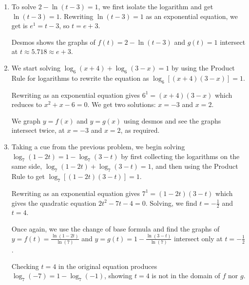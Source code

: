 \documentclass{ximera}
\begin{document}
\begin{example}
\begin{explanation}
\begin{enumerate}
\item  To solve  $2 - \ln(t-3) = 1$, we first isolate the logarithm and get $\ln(t-3) = 1$. Rewriting $\ln(t-3) = 1$ as an exponential equation, we get is $e^{1} = t-3$, so $t =e+3$. 

Desmos shows the graphs of $f(t) = 2 - \ln(t-3)$ and $g(t) = 1$ intersect at $t \approx   5.718 \approx e+3$.

\begin{center}
\end{center}


\item We  start solving $\log_{6}(x+4) + \log_{6}(3-x) = 1$ by using the Product Rule for logarithms to rewrite the equation as  $\log_{6}\left[(x+4)(3-x)\right] = 1$.  

Rewriting as an exponential equation gives $6^{1} = (x+4)(3-x)$ which reduces to $x^2+x-6 = 0$.  We get two solutions: $x=-3$ and $x=2$.   

We graph $y=f(x)$ and $y=g(x)$ using desmos and see the graphs intersect twice, at $x=-3$ and $x=2$, as required.

\begin{center}
\end{center}

\item  Taking a cue from the previous problem, we begin solving $\log_{7}(1-2t) = 1 - \log_{7}(3-t)$ by first collecting the logarithms on the same side, $\log_{7}(1-2t) +  \log_{7}(3-t) = 1$, and then using the Product Rule to get $\log_{7}[(1-2t)(3-t)] = 1$.  

Rewriting  as an exponential equation gives $7^{1} = (1-2t)(3-t)$ which gives the quadratic equation $2t^2-7t-4=0$.  Solving, we find  $t = -\frac{1}{2}$ and $t=4$.  

Once again, we use the change of base formula and find the graphs of  $y = f(t) = \frac{\ln(1-2t)}{\ln(7)}$ and $y=g(t) = 1 - \frac{\ln(3-t)}{\ln(7)}$ intersect only at $t=-\frac{1}{2}$.  

Checking $t=4$ in the original equation produces $\log_{7}(-7) = 1 - \log_{7}(-1)$, showing $t=4$ is not in the domain of $f$ nor $g$.

\begin{center}
\end{center}


\end{enumerate}
\end{explanation}
\end{example}
\end{document}
